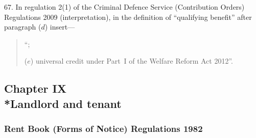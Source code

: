 \documentclass[12pt,a4paper]{article}
\begin{document}
67.  In regulation 2(1) of the Criminal Defence Service (Contribution Orders) Regulations 2009 (interpretation), in the definition of “qualifying benefit” after paragraph ($d$)  insert—
\begin{quotation}
“;

($e$) universal credit under Part~I of the Welfare Reform Act 2012”.
\end{quotation}

\subsection[Chapter IX --- Landlord and tenant]{Chapter IX\\*Landlord and tenant}

\renewcommand\parthead{--- Part III Chapter IX}

\subsubsection[68. Rent Book (Forms of Notice) Regulations 1982]{Rent Book (Forms of Notice) Regulations 1982}
\end{document}
